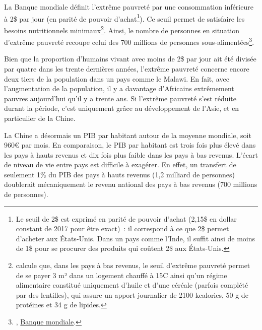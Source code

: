 \documentclass[a5paper,french]{memoir}
\begin{document}
La Banque mondiale définit l'extrême pauvreté par une consommation inférieure à 2\$ par jour (en parité de pouvoir d'achat\footnote{Le seuil de 2\$ est exprimé en parité de pouvoir d'achat (2,15\$ en dollar constant de 2017 pour être exact)~: il correspond à ce que 2\$ permet d'acheter aux États-Unis. Dans un pays comme l'Inde, il suffit ainsi de moins de 1\$ pour se procurer des produits qui coûtent 2\$ aux États-Unis.}). %
Ce seuil permet de satisfaire les besoins nutritionnels minimaux\footnote{\citet{allen_absolute_2017-1} calcule que, dans les pays à bas revenus, le seuil d'extrême pauvreté permet de se payer 3 m² dans un logement chauffé à 15\textdegree{}C ainsi qu'un régime alimentaire constitué uniquement d'huile et d'une céréale (parfois complété par des lentilles), qui assure un apport journalier de 2100 kcalories, 50 g de protéines et 34 g de lipides.}. Ainsi, le nombre de personnes en situation d'extrême pauvreté recoupe celui des 700 millions de personnes sous-alimentées\footnote{\citet{fao_state_2023}, \href{https://data.worldbank.org/indicator/SI.POV.DDAY?end=2019&locations=MW-1W&start=1990&view=chart}{Banque mondiale}.}. 

Bien que la proportion d'humains vivant avec moins de 2\$ par jour ait été divisée par quatre dans les trente dernières années, l'extrême pauvreté concerne encore deux tiers de la population dans un pays comme le Malawi. En fait, avec l'augmentation de la population, il y a davantage d'Africains extrêmement pauvres aujourd'hui qu'il y a trente ans. Si l'extrême pauvreté s'est réduite durant la période, c'est uniquement grâce au développement de l'Asie, et en particulier de la Chine. %

La Chine a désormais un PIB par habitant autour de la moyenne mondiale, soit 960\euro{} par mois. %
En comparaison, le PIB par habitant est trois fois plus élevé dans les pays à hauts revenus et dix fois plus faible dans les pays à bas revenus. L'écart de niveau de vie entre pays est difficile à exagérer. En effet, un transfert de seulement 1\% du PIB des pays à hauts revenus (1,2 milliard de personnes) doublerait mécaniquement le revenu national des pays à bas revenus (700 millions de personnes). 
\end{document}
